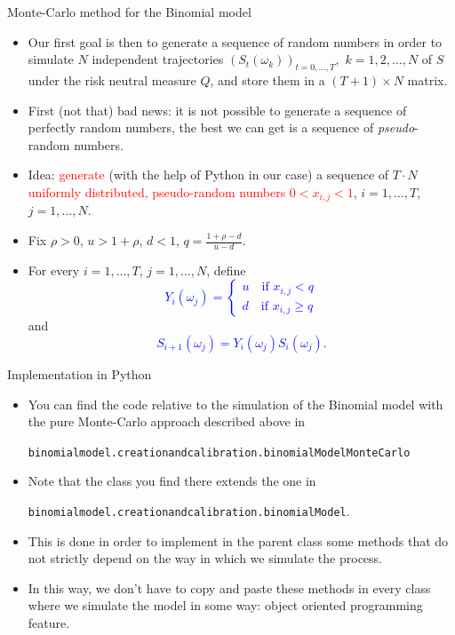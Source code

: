 \documentclass[9 pt]{beamer} %
\def \blue {\textcolor{blue}}
\def \red {\textcolor{red}}
\begin{document}
\begin{frame}{Monte-Carlo method for the Binomial model}
\begin{itemize}
\item Our first goal is then to generate a sequence of random numbers in order to simulate $N$ independent trajectories $(S_t(\omega_k))_{t = 0, \dots,T},$ $k=1,2,\dots,N$ of $S$ under the risk neutral measure $Q$, and store them in a $(T+1) \times N$ matrix.
\item First (not that) bad news: it is not possible to generate a sequence of perfectly random numbers, the best we can get is a sequence of \emph{pseudo}-random numbers.
\item Idea: \red{generate} (with the help of Python in our case) a sequence of $T \cdot N$ \red{uniformly distributed, pseudo-random numbers $0 < x_{i,j} < 1$}, $i=1,\dots,T$, $j=1,\dots,N$. 
\item Fix $\rho>0$, $u>1+\rho$, $d<1$, $q=\frac{1+\rho-d}{u-d}.$ 
\item For every $i=1,\dots,T$, $j=1,\dots,N$, define 
\blue{$$
Y_{i}(\omega_j)=
\begin{cases}
u \quad \text{if $x_{i,j} <q$}\\
d \quad \text{if $x_{i,j} \ge q$}
\end{cases}
$$}
and
\blue{$$
S_{i+1}(\omega_j)=Y_{i}(\omega_j)S_{i}(\omega_j).
$$}
\end{itemize}
\end{frame}

\begin{frame}{Implementation in Python}
\begin{itemize}
\item You can find the code relative to the simulation of the Binomial model with the pure Monte-Carlo approach described above in
\begin{center}
\texttt{binomialmodel.creationandcalibration.binomialModelMonteCarlo}
\end{center}
\item Note that the class you find there extends the one in
\begin{center}
\texttt{binomialmodel.creationandcalibration.binomialModel}.
\end{center}
\item This is done in order to implement in the parent class some methods that do not strictly depend on the way in which we simulate the process.
\item In this way, we don't have to copy and paste these methods in every class where we simulate the model in some way: object oriented programming feature.
\end{itemize}
\end{frame}
\end{document}
